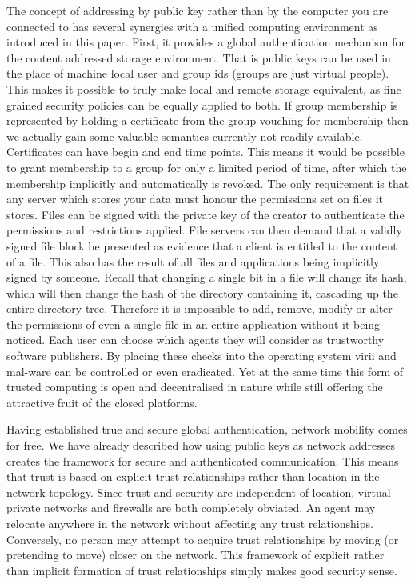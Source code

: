 \documentclass[british,english]{article}
\begin{document}
The concept of addressing by public key rather than by the computer
you are connected to has several synergies with a unified computing
environment as introduced in this paper. First, it provides a global
authentication mechanism for the content addressed storage environment.
That is public keys can be used in the place of machine local user
and group ids (groups are just virtual people). This makes it possible
to truly make local and remote storage equivalent, as fine grained
security policies can be equally applied to both. If group membership
is represented by holding a certificate from the group vouching for
membership then we actually gain some valuable semantics currently
not readily available. Certificates can have begin and end time points.
This means it would be possible to grant membership to a group for
only a limited period of time, after which the membership implicitly
and automatically is revoked. The only requirement is that any server
which stores your data must honour the permissions set on files it
stores. Files can be signed with the private key of the creator to
authenticate the permissions and restrictions applied. File servers
can then demand that a validly signed file block be presented as evidence
that a client is entitled to the content of a file. This also has
the result of all files and applications being implicitly signed by
someone. Recall that changing a single bit in a file will change its
hash, which will then change the hash of the directory containing
it, cascading up the entire directory tree. Therefore it is impossible
to add, remove, modify or alter the permissions of even a single file
in an entire application without it being noticed. Each user can choose
which agents they will consider as trustworthy software publishers.
By placing these checks into the operating system virii and mal-ware
can be controlled or even eradicated. Yet at the same time this form
of trusted computing is open and decentralised in nature while still
offering the attractive fruit of the closed platforms.

Having established true and secure global authentication, network
mobility comes for free. We have already described how using public
keys as network addresses creates the framework for secure and authenticated
communication. This means that trust is based on explicit trust relationships
rather than location in the network topology. Since trust and security
are independent of location, virtual private networks and firewalls
are both completely obviated. An agent may relocate anywhere in the
network without affecting any trust relationships. Conversely, no
person may attempt to acquire trust relationships by moving (or pretending
to move) closer on the network. This framework of explicit rather
than implicit formation of trust relationships simply makes good security
sense.
\end{document}
